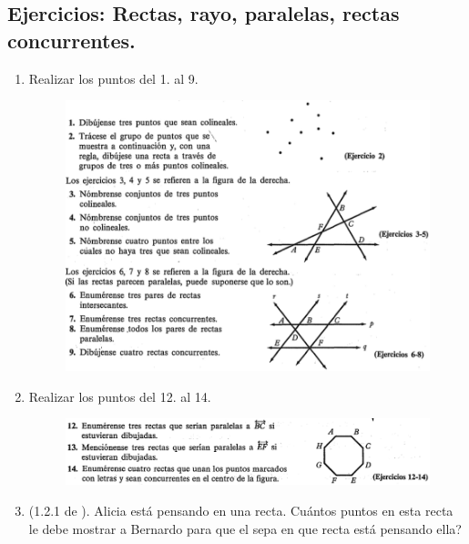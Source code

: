 \newpage
\begin{center}
	\vspace{-1cm}
	\subsection{Ejercicios: Rectas, rayo, paralelas, rectas concurrentes.}\label{ejercicios_subseccion_rayo_recta_paralelas_etc}
\end{center}
	\begin{enumerate}
		\item Realizar los puntos del 1. al 9.
		\begin{figure}[H]
			\centering
			\includegraphics[width=\linewidth]{Geometria/imgs/Clemens_p14_1to9}
			\label{Clemens_p14_1to9}
		\end{figure}
		\item Realizar los puntos del 12. al 14.
		\begin{figure}[H]
			\centering
			\includegraphics[width=\linewidth]{Geometria/imgs/CLEMENS_p15_12to14}
			\label{CLEMENS_p15_12to14}
		\end{figure}
		\item (1.2.1 de \cite{Aops_Geometria}). Alicia está pensando en una recta. Cuántos puntos en esta recta le debe mostrar a Bernardo para que el sepa en que recta está pensando ella?

\end{enumerate}
